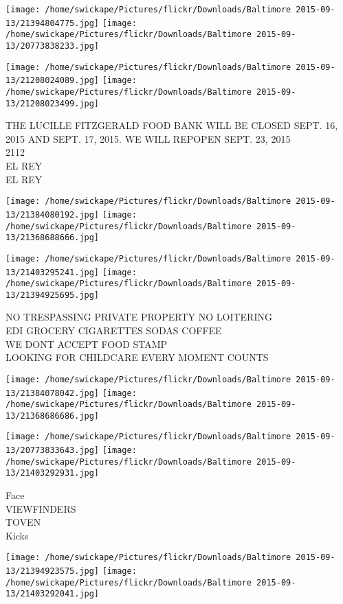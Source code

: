 \documentclass[10pt,letterpaper]{article}
\begin{document}
\texttt{[image: /home/swickape/Pictures/flickr/Downloads/Baltimore 2015-09-13/21394804775.jpg]}
\texttt{[image: /home/swickape/Pictures/flickr/Downloads/Baltimore 2015-09-13/20773838233.jpg]}

\texttt{[image: /home/swickape/Pictures/flickr/Downloads/Baltimore 2015-09-13/21208024089.jpg]}
\texttt{[image: /home/swickape/Pictures/flickr/Downloads/Baltimore 2015-09-13/21208023499.jpg]}

THE LUCILLE FITZGERALD FOOD BANK WILL BE CLOSED SEPT. 16, 2015 AND SEPT. 17, 2015.  WE WILL REPOPEN SEPT. 23, 2015\\
2112\\
EL REY\\
EL REY\\
\pagebreak

\texttt{[image: /home/swickape/Pictures/flickr/Downloads/Baltimore 2015-09-13/21384080192.jpg]}
\texttt{[image: /home/swickape/Pictures/flickr/Downloads/Baltimore 2015-09-13/21368688666.jpg]}

\texttt{[image: /home/swickape/Pictures/flickr/Downloads/Baltimore 2015-09-13/21403295241.jpg]}
\texttt{[image: /home/swickape/Pictures/flickr/Downloads/Baltimore 2015-09-13/21394925695.jpg]}

NO TRESPASSING PRIVATE PROPERTY NO LOITERING\\
EDI GROCERY CIGARETTES SODAS COFFEE\\
WE DONT ACCEPT FOOD STAMP\\
LOOKING FOR CHILDCARE EVERY MOMENT COUNTS\\
\pagebreak

\texttt{[image: /home/swickape/Pictures/flickr/Downloads/Baltimore 2015-09-13/21384078042.jpg]}
\texttt{[image: /home/swickape/Pictures/flickr/Downloads/Baltimore 2015-09-13/21368686686.jpg]}

\texttt{[image: /home/swickape/Pictures/flickr/Downloads/Baltimore 2015-09-13/20773833643.jpg]}
\texttt{[image: /home/swickape/Pictures/flickr/Downloads/Baltimore 2015-09-13/21403292931.jpg]}

Face\\
VIEWFINDERS\\
TOVEN\\
Kicks\\
\pagebreak

\texttt{[image: /home/swickape/Pictures/flickr/Downloads/Baltimore 2015-09-13/21394923575.jpg]}
\texttt{[image: /home/swickape/Pictures/flickr/Downloads/Baltimore 2015-09-13/21403292041.jpg]}
\end{document}
